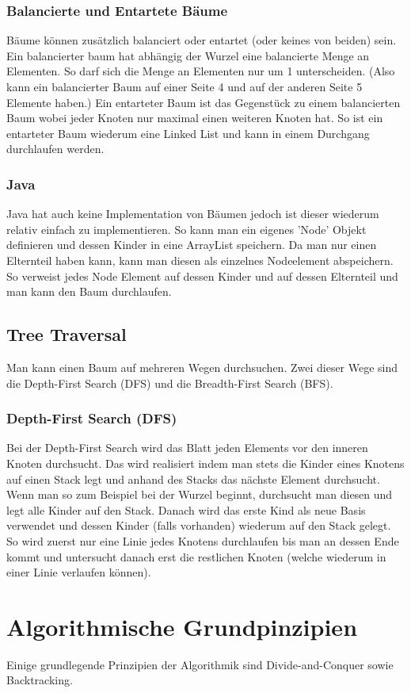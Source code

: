 \documentclass{article}
\begin{document}
	\subsubsection{Balancierte und Entartete Bäume}
	Bäume können zusätzlich balanciert oder entartet (oder keines von beiden) sein. Ein balancierter baum hat abhängig der Wurzel eine balancierte Menge an Elementen. So darf sich die Menge an Elementen nur um 1 unterscheiden. (Also kann ein balancierter Baum auf einer Seite 4 und auf der anderen Seite 5 Elemente haben.) Ein entarteter Baum ist das Gegenstück zu einem balancierten Baum wobei jeder Knoten nur maximal einen weiteren Knoten hat. So ist ein entarteter Baum wiederum eine Linked List und kann in einem Durchgang durchlaufen werden.
	\subsubsection{Java}
	Java hat auch keine Implementation von Bäumen jedoch ist dieser wiederum relativ einfach zu implementieren. So kann man ein eigenes 'Node' Objekt definieren und dessen Kinder in eine ArrayList speichern. Da man nur einen Elternteil haben kann, kann man diesen als einzelnes Nodeelement abspeichern. So verweist jedes Node Element auf dessen Kinder und auf dessen Elternteil und man kann den Baum durchlaufen.
	\subsection{Tree Traversal}
	Man kann einen Baum auf mehreren Wegen durchsuchen. Zwei dieser Wege sind die Depth-First Search (DFS) und die Breadth-First Search (BFS).
	\subsubsection{Depth-First Search (DFS)}
	Bei der Depth-First Search wird das Blatt jeden Elements vor den inneren Knoten durchsucht. Das wird realisiert indem man stets die Kinder eines Knotens auf einen Stack legt und anhand des Stacks das nächste Element durchsucht. Wenn man so zum Beispiel bei der Wurzel beginnt, durchsucht man diesen und legt alle Kinder auf den Stack. Danach wird das erste Kind als neue Basis verwendet und dessen Kinder (falls vorhanden) wiederum auf den Stack gelegt. So wird zuerst nur eine Linie jedes Knotens durchlaufen bis man an dessen Ende kommt und untersucht danach erst die restlichen Knoten (welche wiederum in einer Linie verlaufen können).
	\section{Algorithmische Grundpinzipien}
	Einige grundlegende Prinzipien der Algorithmik sind Divide-and-Conquer sowie Backtracking.
\end{document}

